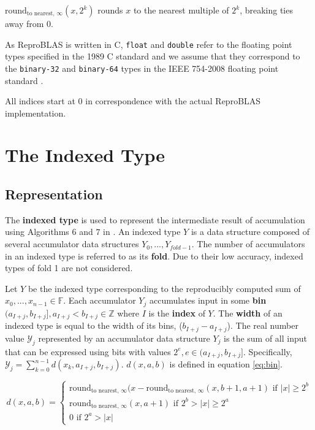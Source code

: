 \documentclass[12pt]{article}
\providecommand{\F}{\ensuremath{\mathbb{F}}}
\providecommand{\Z}{\ensuremath{\mathbb{Z}}}
\providecommand{\roundtonearestinfty}{\ensuremath{\text{round}_\text{to nearest, $\infty$}}}
\theoremstyle{plain}
\begin{document}
  $\roundtonearestinfty(x, 2^k)$ rounds $x$ to the nearest multiple of $2^k$, breaking ties away from 0.

  As ReproBLAS is written in C, \verb|float| and \verb|double| refer to the floating point types specified in the 1989 C standard \cite{c89} and we assume that they correspond to the \verb|binary-32| and \verb|binary-64| types in the IEEE 754-2008 floating point standard \cite{ieee754}.

  All indices start at $0$ in correspondence with the actual ReproBLAS implementation.

\section{The Indexed Type}
  \subsection{Representation}
    The \textbf{indexed type} is used to represent the intermediate result of accumulation using Algorithms 6 and $7$ in \cite{repsum}.
    An indexed type $Y$ is a data structure composed of several accumulator data structures $Y_0, ..., Y_{fold - 1}$. The number of accumulators in an indexed type is referred to as its \textbf{fold}. Due to their low accuracy, indexed types of fold 1 are not considered.

    Let $Y$ be the indexed type corresponding to the reproducibly computed sum of $x_0, ..., x_{n - 1} \in \F$.
    Each accumulator $Y_j$ accumulates input in some \textbf{bin} $(a_{I + j}, b_{I + j}], a_{I + j} < b_{I + j} \in \Z$ where $I$ is the \textbf{index} of $Y$. The \textbf{width} of an indexed type is equal to the width of its bins, ($b_{I + j} - a_{I + j}$). The real number value $\mathcal{Y}_j$ represented by an accumulator data structure $Y_j$ is the sum of all input that can be expressed using bits with values $2^e, e \in (a_{I + j}, b_{I + j}]$. Specifically, $\mathcal{Y}_j = \sum\limits_{k = 0}^{n - 1}d(x_k, a_{I + j}, b_{I + j})$. $d(x, a, b)$ is defined in equation \ref{eq:bin}.

    \begin{equation}
    \label{eq:bin}
    d(x, a, b) = \begin{cases}\roundtonearestinfty(x - \roundtonearestinfty(x, b + 1, a + 1) \text{ if } |x| \geq 2^b \\ \roundtonearestinfty(x, a + 1) \text{ if } 2^b > |x| \geq 2^a \\ 0 \text{ if } 2^a > |x| \end{cases}
    \end{equation}
\end{document}
